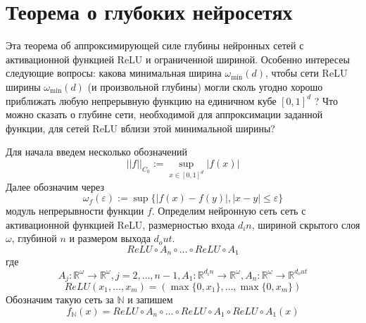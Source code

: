 \documentclass[12pt, twoside]{article}
\theoremstyle{definition}
\begin{document}
\section{Теорема о глубоких нейросетях}
Эта теорема об аппроксимирующей силе глубины нейронных сетей с активационной функцией ReLU и ограниченной шириной. Особенно интересеы следующие вопросы: какова минимальная ширина $\omega_\min(d)$, чтобы сети ReLU ширины $\omega_\min(d)$ (и произвольной глубины) могли сколь угодно хорошо приближать любую непрерывную функцию на единичном кубе $[0,1]^d$ ? Что можно сказать о глубине сети, необходимой для аппроксимации заданной функции, для сетей ReLU вблизи этой минимальной ширины?

Для начала введем несколько обозначений
\begin{equation}\label{eq100}
||f||_{C_0}:=\sup_{x\in [0,1]^d} |f(x)|
\end{equation}
Далее обозначим через
\begin{equation}\label{eq101}
\omega_f(\varepsilon):=\sup\{|f(x)-f(y)| , |x-y|\leq\varepsilon\}
\end{equation}
модуль непрерывности функции $f$. Определим нейронную сеть
сеть с активационной функцией ReLU, размерностью входа $d_in$, шириной скрытого слоя $\omega$, глубиной $n$ и размером выхода $d_out$.
\begin{equation}\label{eq102}
ReLU\circ A_n \circ\dots\circ ReLU \circ A_1
\end{equation}
где
\begin{equation}\label{eq103}
A_j:\mathbb{R}^\omega\rightarrow\mathbb{R}^\omega, j=2,\dots,n-1, 
A_1:\mathbb{R}^{d_in}\rightarrow\mathbb{R}^\omega, A_n:\mathbb{R}^{\omega}\rightarrow\mathbb{R}^{d_out}
\end{equation}
\begin{equation}\label{eq104}
ReLU(x_1,\dots,x_m) = (\max\{0,x_1\},\dots,\max\{0,x_m\})
\end{equation}
Обозначим такую сеть за $\mathbb{N}$ и запишем
\begin{equation}\label{eq105}
f_{\mathbb{N}}(x) = ReLU\circ A_n \circ\dots\circ ReLU \circ A_1\circ ReLU \circ A_1(x)
\end{equation}
\end{document}
